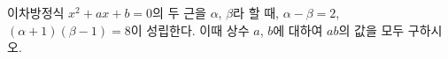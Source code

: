 이차방정식 $x^2+ax+b=0$의 두 근을 $\alpha$, $\beta$라 할 때, $\alpha-\beta=2$, $(\alpha+1)(\beta-1)=8$이 성립한다. 이때 상수 $a$, $b$에 대하여 $ab$의 값을 모두 구하시오.
